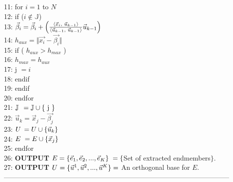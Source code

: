 \documentclass[11pt, oneside]{Thesis} %
\begin{document}
\begin{flushleft}
11: \hspace{0.8cm}for $i=1$ to $N$\\
12: \hspace{1.2cm}if ($i \not \in \mathbb{J}$)\\
13: \hspace{1.7cm}$\vec{\beta}_{i} = \vec{\beta}_{i} + \left( \frac{\langle \vec{x}_{i}, 
\hspace{0.1cm} \vec{u}_{k-1} \rangle}{\langle \vec{u}_{k-1},\hspace{0.1cm} \vec{u}_{k-1} 
\rangle} \vec{u}_{k-1} \right)$\\
14: \hspace{1.7cm}$h_{aux} = \Vert \vec{x_{i}} - \vec{\beta_{i}} \Vert $\\
15: \hspace{1.7cm}if ( $h_{aux} > h_{max}$ )\\
16: \hspace{2.2cm}$h_{max} = h_{aux}$\\
17: \hspace{2.2cm}j $=i$\\
18: \hspace{1.7cm}\small{endif}\\
19: \hspace{1.2cm}\small{endif}\\
20: \hspace{0.8cm}\small{endfor}\\
21: \hspace{0.8cm}$\mathbb{J} \hspace{1.5mm} = \mathbb{J} \cup \lbrace \text{ j } \rbrace $\\
22: \hspace{0.8cm}$\vec{u}_k = \vec{x}_{j} - \vec{\beta_{j}} $\\
23: \hspace{0.8cm}$U \hspace{0.7mm} = U \cup \lbrace \vec{u}_k \rbrace $\\
24: \hspace{0.8cm}$E \hspace{1.1mm} = E \cup \lbrace \vec{x}_{j} \rbrace $\\
25: \hspace{0.19cm}endfor\\
26: \hspace{0.19cm}\textbf{OUTPUT} $E = \lbrace \vec{e}_{1}, \vec{e}_{2}, ..., 
\vec{e}_{K} \rbrace \hspace{1mm}  = \lbrace$Set of extracted endmembers$\rbrace$. \\
27: \hspace{0.19cm}\textbf{OUTPUT} $U \hspace{0.2mm}  = \lbrace \vec{u}^{1}, \vec{u}^{2}, ..., 
\vec{u}^{K} \rbrace = $ An orthogonal base for $E$.\\
\noindent---------------------------------------------------------------------------------------------------\\
\end{flushleft}
\end{document}
